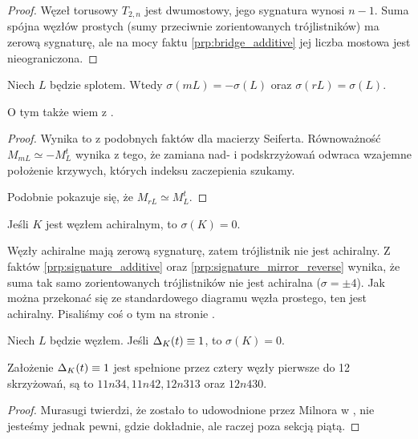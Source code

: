 \begin{proof}
    Węzeł torusowy $T_{2,n}$ jest dwumostowy, jego sygnatura wynosi $n - 1$.
    Suma spójna węzłów prostych (sumy przeciwnie zorientowanych trójlistników) ma zerową sygnaturę, ale na mocy faktu \ref{prp:bridge_additive} jej liczba mostowa jest nieograniczona.
\end{proof}

\begin{proposition}
%
%
\label{prp:signature_mirror_reverse}%
    Niech $L$ będzie splotem.
    Wtedy $\sigma(mL) = -\sigma(L)$ oraz $\sigma(rL) = \sigma(L)$.
\end{proposition}

O tym także wiem z \cite[s. 127]{murasugi96}.

\begin{proof}
    Wynika to z podobnych faktów dla macierzy Seiferta.
    Równoważność $M_{mL} \simeq - M_L^t$ wynika z tego, że zamiana nad- i podskrzyżowań odwraca wzajemne położenie krzywych, których indeksu zaczepienia szukamy.

    Podobnie pokazuje się, że $M_{rL} \simeq M_L^t$.
\end{proof}

\begin{corollary}
%
\label{cor:acheiral_signature}%
    Jeśli $K$ jest węzłem achiralnym, to $\sigma(K) = 0$.
\end{corollary}

Węzły achiralne mają zerową sygnaturę, zatem trójlistnik nie jest achiralny.
Z faktów \ref{prp:signature_additive} oraz \ref{prp:signature_mirror_reverse} wynika, że suma tak samo zorientowanych trójlistników nie jest achiralna ($\sigma = \pm 4$).
Jak można przekonać się ze standardowego diagramu węzła prostego, ten jest achiralny.
Pisaliśmy coś o tym na stronie \pageref{two_sums_of_two_trefoils}.

\begin{proposition}
%
    Niech $L$ będzie węzłem.
    Jeśli $\Delta_K(t) \equiv 1$, to $\sigma (K) = 0$.
\end{proposition}

Założenie $\Delta_K(t) \equiv 1$ jest spełnione przez cztery węzły pierwsze do 12 skrzyżowań, są to $11n34, 11n42, 12n313$ oraz $12n430$.

\begin{proof}
    Murasugi twierdzi, że zostało to udowodnione przez Milnora w \cite{milnor68}, nie jesteśmy jednak pewni, gdzie dokładnie, ale raczej poza sekcją piątą.
\end{proof}

